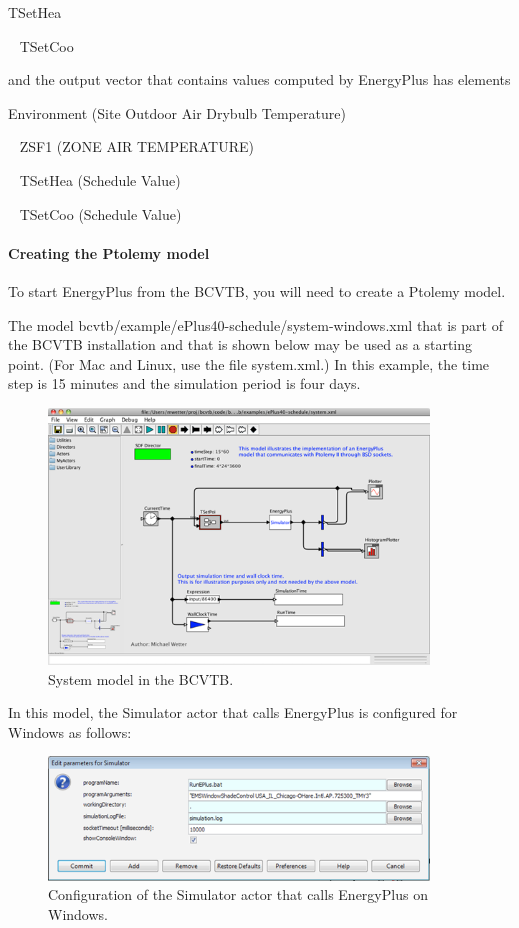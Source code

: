 TSetHea

~ TSetCoo

and the output vector that contains values computed by EnergyPlus has elements

Environment (Site Outdoor Air Drybulb Temperature)

~ ZSF1 (ZONE AIR TEMPERATURE)

~ TSetHea (Schedule Value)

~ TSetCoo (Schedule Value)

\paragraph{\texorpdfstring{\textbf{Creating the Ptolemy model}}{Creating the Ptolemy model}}\label{creating-the-ptolemy-model}

To start EnergyPlus from the BCVTB, you will need to create a Ptolemy model.

The model bcvtb/example/ePlus40-schedule/system-windows.xml that is part of the BCVTB installation and that is shown below may be used as a starting point. (For Mac and Linux, use the file system.xml.) In this example, the time step is 15 minutes and the simulation period is four days.

\begin{figure}[hbtp] %
\centering
\includegraphics[width=0.9\textwidth, height=0.9\textheight, keepaspectratio=true]{media/image005.png}
\caption{System model in the BCVTB. \protect \label{fig:system-model-in-the-bcvtb.}}
\end{figure}

In this model, the Simulator actor that calls EnergyPlus is configured for Windows as follows:

\begin{figure}[hbtp] %
\centering
\includegraphics[width=0.9\textwidth, height=0.9\textheight, keepaspectratio=true]{media/image006.png}
\caption{Configuration of the Simulator actor that calls EnergyPlus on Windows. \protect \label{fig:configuration-of-the-simulator-actor-that}}
\end{figure}

